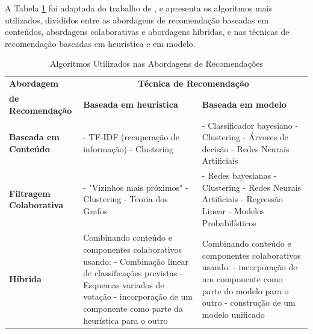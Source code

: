 A Tabela \ref{tab01} foi adaptada do trabalho de , e apresenta os algoritmos mais utilizados, 
divididos entre as abordagens de recomendação baseadas em conteúdos, abordagens colaborativas e 
abordagens híbridas, e nas técnicas de recomendação baseadas em heurística e em modelo. 

\begin{table}[htbp]
	\centering
	\caption{Algoritmos Utilizados nas Abordagens de Recomendações}
	\label{tab01}
	\begin{tabular}{p{5cm}p{4.8cm}p{4.8cm}}
	\toprule
	 \textbf{Abordagem} & \multicolumn{2}{c}{ \textbf{Técnica de Recomendação}} \\  
	\textbf{de Recomendação}
	\multirow{-2}{*}{} &  \textbf{Baseada em heurística} & \textbf{Baseada em modelo} \\ 
	\midrule
	\textbf{Baseada em Conteúdo	}   &  - TF-IDF (recuperação de informação) \newline - Clustering   &  - Classificador bayesiano \newline - Clustering \newline - Árvores de decisão \newline - Redes Neurais Artificiais   \\ 
	\midrule

	\textbf{Filtragem Colaborativa}	&  - "Vizinhos mais próximos" \newline - Clustering \newline - Teoria dos Grafos   &  - Redes bayesianas \newline - Clustering \newline - Redes Neurais Artificiais \newline - Regressão Linear \newline - Modelos Probabilísticos   \\ 
	\midrule

	\textbf{Híbrida} &  Combinando conteúdo e componentes colaborativos usando:  \newline - Combinação linear de classificações previstas \newline - Esquemas variados de votação \newline - incorporação de um componente como parte da heurística para o outro          & Combinando conteúdo e componentes colaborativos usando: \newline - incorporação de um componente como parte do modelo para o outro \newline - construção de um modelo unificado   \\ 
\bottomrule	
\end{tabular}
\end{table}

